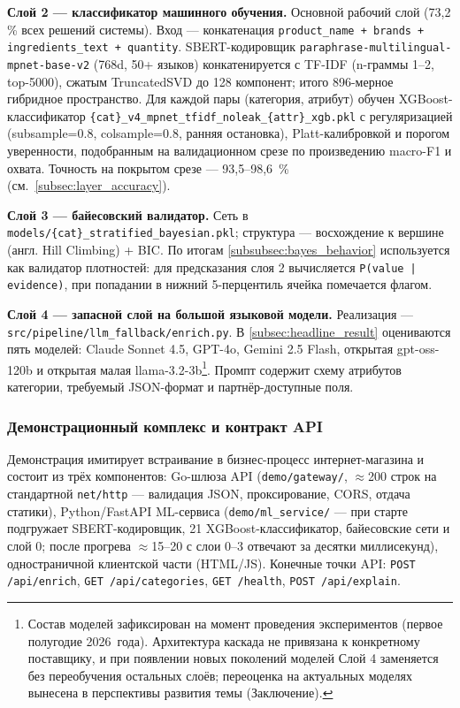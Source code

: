 \textbf{Слой 2 — классификатор машинного обучения.} Основной рабочий слой (73,2 \% всех решений системы). Вход — конкатенация \texttt{product\_name + brands + ingredients\_text + quantity}. SBERT-кодировщик \texttt{paraphrase-\allowbreak multilingual-\allowbreak mpnet-\allowbreak base-v2} (768d, 50+ языков) конкатенируется с TF-IDF (n-граммы 1–2, top-5000), сжатым TruncatedSVD до 128 компонент; итого 896-мерное гибридное пространство. Для каждой пары (категория, атрибут) обучен XGBoost-классификатор \texttt{\{cat\}\_v4\_mpnet\_tfidf\_noleak\_\{attr\}\_xgb.pkl} с регуляризацией (subsample=0.8, colsample=0.8, ранняя остановка), Platt-калибровкой и порогом уверенности, подобранным на валидационном срезе по произведению macro-F1 и охвата. Точность на покрытом срезе — 93,5--98,6~\% (см.~\ref{subsec:layer_accuracy}).

\textbf{Слой 3 — байесовский валидатор.} Сеть в \texttt{models/\{cat\}\_stratified\_bayesian.pkl}; структура — восхождение к вершине (англ. Hill Climbing) + BIC. По итогам \ref{subsubsec:bayes_behavior} используется как валидатор плотностей: для предсказания слоя 2 вычисляется \texttt{P(value | evidence)}, при попадании в нижний 5-перцентиль ячейка помечается флагом.

\textbf{Слой 4 — запасной слой на большой языковой модели.} Реализация — \texttt{src/pipeline/llm\_fallback/enrich.py}. В \ref{subsec:headline_result} оцениваются пять моделей: Claude Sonnet 4.5, GPT-4o, Gemini 2.5 Flash, открытая gpt-oss-120b и открытая малая llama-3.2-3b\footnote{Состав моделей зафиксирован на момент проведения экспериментов (первое полугодие 2026~года). Архитектура каскада не привязана к конкретному поставщику, и при появлении новых поколений моделей Слой 4 заменяется без переобучения остальных слоёв; переоценка на актуальных моделях вынесена в перспективы развития темы (Заключение).}. Промпт содержит схему атрибутов категории, требуемый JSON-формат и партнёр-доступные поля.

\subsubsection{Демонстрационный комплекс и контракт API}
\label{subsubsec:demo_api}

Демонстрация имитирует встраивание в бизнес-процесс интернет-магазина и состоит из трёх компонентов: Go-шлюза API (\texttt{demo/gateway/}, $\approx$200 строк на стандартной \texttt{net/http} — валидация JSON, проксирование, CORS, отдача статики), Python/FastAPI ML-сервиса (\texttt{demo/ml\_service/} — при старте подгружает SBERT-кодировщик, 21 XGBoost-классификатор, байесовские сети и слой 0; после прогрева $\approx$15–20 с слои 0–3 отвечают за десятки миллисекунд), одностраничной клиентской части (HTML/JS). Конечные точки API: \texttt{POST /api/enrich}, \texttt{GET /api/categories}, \texttt{GET /health}, \texttt{POST /api/explain}.

